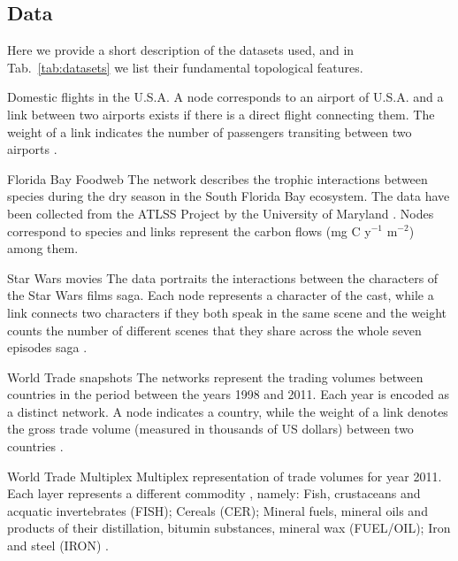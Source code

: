 \documentclass[aps,twocolumn,superscriptaddress]{revtex4-1}
\begin{document}
\subsection{Data\label{sec:data}}
Here we provide a short description of the datasets used, and in Tab.~\ref{tab:datasets} we list their fundamental topological features.
%
\begin{basedescript}{%
  \desclabelstyle{\multilinelabel}
  \desclabelwidth{2cm}}
\setlength\itemsep{0.2cm}
%
 \item[Domestic flights in the U.S.A.] A node corresponds to an airport of U.S.A. and a link between two airports exists if there is a direct flight connecting them. The weight of a link indicates the number of passengers transiting between two airports \cite{barrat-pnas-2004}.
%
 \item[Florida Bay Foodweb] The network describes the trophic interactions between species during the dry season in the South Florida Bay ecosystem. The data have been collected from the ATLSS Project by the University of Maryland \cite{ulanowicz-food-1998}. Nodes correspond to species and links represent the carbon flows (mg C y$^{-1}$ m$^{-2}$) among them. 
% 
 \item[Star Wars movies] The data portraits the interactions between the characters of the Star Wars films saga. Each node represents a character of the cast, while a link connects two characters if they both speak in the same scene and the weight counts the number of different scenes that they share across the whole seven episodes saga \cite{gabasova-starwars-2015}.
% 
 \item[World Trade snapshots] The networks represent the trading volumes between countries in the period between the years 1998 and 2011. Each year is encoded as a distinct network. A node indicates a country, while the weight of a link denotes the gross trade volume (measured in thousands of US dollars) between two countries \cite{Comtrade, Baci}.
%
 \item[World Trade Multiplex] Multiplex representation of trade volumes for year 2011. Each layer represents a different commodity \cite{boccaletti-phys_rep-2014}, namely: Fish, crustaceans and acquatic invertebrates (FISH); Cereals (CER); Mineral fuels, mineral oils and products of their distillation, bitumin substances, mineral wax (FUEL/OIL); Iron and steel (IRON) \cite{Comtrade, Baci}.
%
\end{basedescript}
%
%
\end{document}
